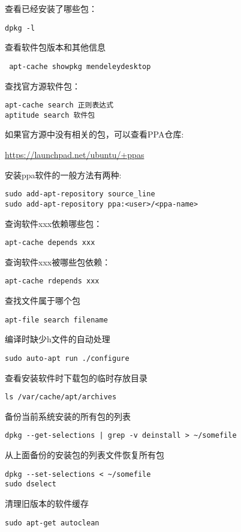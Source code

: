 查看已经安装了哪些包：
\begin{verbatim}
dpkg -l
\end{verbatim}

查看软件包版本和其他信息
\begin{verbatim}
 apt-cache showpkg mendeleydesktop
\end{verbatim}

查找官方源软件包：
\begin{verbatim}
apt-cache search 正则表达式
aptitude search 软件包
\end{verbatim}

如果官方源中没有相关的包，可以查看PPA仓库:

\url{https://launchpad.net/ubuntu/+ppas}

安装ppa软件的一般方法有两种:
\begin{verbatim}
sudo add-apt-repository source_line
sudo add-apt-repository ppa:<user>/<ppa-name>
\end{verbatim}

查询软件xxx依赖哪些包：
\begin{verbatim}
apt-cache depends xxx
\end{verbatim}

查询软件xxx被哪些包依赖：
\begin{verbatim}
apt-cache rdepends xxx
\end{verbatim}

查找文件属于哪个包
\begin{verbatim}
apt-file search filename
\end{verbatim}

编译时缺少h文件的自动处理
\begin{verbatim}
sudo auto-apt run ./configure
\end{verbatim}

查看安装软件时下载包的临时存放目录
\begin{verbatim}
ls /var/cache/apt/archives
\end{verbatim}

备份当前系统安装的所有包的列表
\begin{verbatim}
dpkg --get-selections | grep -v deinstall > ~/somefile
\end{verbatim}

从上面备份的安装包的列表文件恢复所有包
\begin{verbatim}
dpkg --set-selections < ~/somefile
sudo dselect
\end{verbatim}

清理旧版本的软件缓存
\begin{verbatim}
sudo apt-get autoclean
\end{verbatim}

